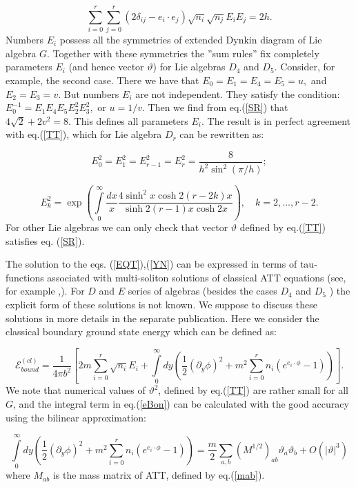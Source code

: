 \documentclass[a4paper,12pt]{article}
\begin{document}
\begin{equation}
\sum\limits_{i=0}^r\sum\limits_{j=0}^r\left( 2\delta _{ij}-e_i\cdot e_j\right) 
\sqrt{n_i}\sqrt{n_j}E_iE_j=2h.  \label{SR}
\end{equation}
Numbers $E_i$ possess all the symmetries of extended Dynkin diagram of Lie
algebra $G$. Together with these symmetries the ''sum rules'' fix
completely parameters $E_i$ (and hence vector $\vartheta $) for Lie algebras 
$D_4$ and $D_5$. Consider, for example, the second case. There we have that 
$E_0=E_1=E_4=E_5=u,$ and $E_2=E_3=v$. But numbers $E_i$ are not independent.
They satisfy the condition: $E_0^{-1}=E_1E_4E_5E_2^2E_3^2,$ or $u=1/v.$ Then
we find from eq.(\ref{SR}) that $4\sqrt{2}+2v^2=8$. This defines all
parameters $E_i$. The result is in perfect agreement with eq.(\ref{TT}),
which for Lie algebra $D_r$ can be rewritten as:

\[
E_0^2=E_1^2=E_{r-1}^2=E_r^2=\frac 8{h^2\sin ^2(\pi /h)}; 
\]

\begin{equation}
E_k^2=\exp \left( \int\limits_0^\infty \frac{dx}x\frac{4\sinh ^2x\cosh 2(r-2k)x}{\sinh
2(r-1)x\cosh 2x}\right) ,\quad k=2,...,r-2.  \label{ESQW}
\end{equation}
For other Lie algebras we can only check that vector $\vartheta $ defined by
eq.(\ref{TT}) satisfies eq. (\ref{SR}).

The solution to the eqs. (\ref{EQT}),(\ref{YN}) can be expressed in terms
of tau-functions associated with multi-soliton solutions of classical ATT
equations (see, for example \cite{BOWC},\cite{BOW}). For $D$ and $E$ series
of algebras (besides the cases $D_4$ and $D_5$ \cite{BOWC} ) the explicit
form of these solutions is not known. We suppose to discuss these solutions
in more details in the separate publication. Here we consider the classical
boundary ground state energy which can be defined as:

\begin{equation}
\mathcal{E}_{bound}^{(cl)}=\frac 1{4\pi b^2}[2m\sum_{i=0}^r\sqrt{n_i}%
E_i+\int\limits_0^\infty dy(\frac 12(\partial _y\phi
)^2+m^2\sum_{i=0}^r n_i(e^{e_i\cdot \phi }-1))].  \label{eBon}
\end{equation}
We note that numerical values of $\vartheta ^2$, defined by eq.(\ref{TT})
are rather small for all $G$, and the integral term in eq.(\ref{eBon}) can
be calculated with the good accuracy using the bilinear approximation:

\[
\int\limits_0^\infty dy(\frac 12(\partial _y\phi
)^2+m^2\sum_{i=0}^r n_i(e^{e_i\cdot \phi }-1))=\frac
m2\sum_{a,b}(M^{1/2})_{ab}\vartheta _a\vartheta _b+O(|\vartheta |^3) 
\]
where $M_{ab}$ is the mass matrix of ATT, defined by eq.(\ref{mab}).
\end{document}
